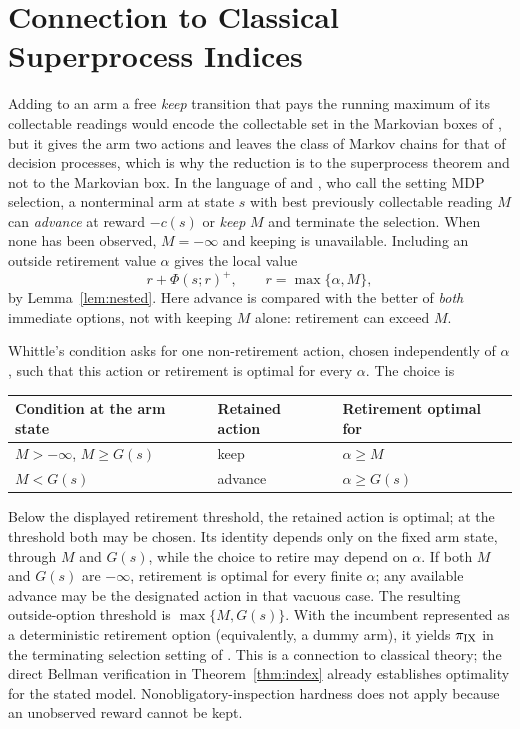 \section{Connection to Classical Superprocess Indices}
\label{app:remarks}

\begin{remark}\label{rem:whittle}
Adding to an arm a free \emph{keep} transition that pays the running maximum of its collectable
readings would encode the collectable set in the Markovian boxes of \citet{gupta2019markovian},
but it gives the arm two actions and leaves the class of Markov chains for that of decision
processes, which is why the reduction is to the superprocess theorem and not to the Markovian box.
In the language of \citet{whittle1980gittins} and \citet[\S5.2.2]{scully2025gittins}, who call the setting MDP selection, a
nonterminal arm at state $s$ with best previously collectable reading $M$ can \emph{advance}
at reward $-c(s)$ or \emph{keep} $M$ and terminate the selection. When none has been observed,
$M=-\infty$ and keeping is unavailable. Including an outside retirement value $\alpha$ gives
the local value
\[
r+\Phi(s;r)^+,\qquad r=\max\{\alpha,M\},
\]
by Lemma~\ref{lem:nested}. Here advance is compared with the better of \emph{both} immediate
options, not with keeping $M$ alone: retirement can exceed $M$.

Whittle's condition asks for one non-retirement action, chosen independently of $\alpha$,
such that this action or retirement is optimal for every $\alpha$. The choice is
\begin{center}
\begin{tabular}{lll}
\toprule
Condition at the arm state & Retained action & Retirement optimal for \\
\midrule
$M> -\infty$, $M\ge G(s)$ & keep & $\alpha\ge M$ \\
$M<G(s)$ & advance & $\alpha\ge G(s)$ \\
\bottomrule
\end{tabular}
\end{center}
Below the displayed retirement threshold, the retained action is optimal;
at the threshold both may be chosen. Its identity depends only on the fixed
arm state, through $M$ and $G(s)$, while the choice to retire may depend on $\alpha$.
If both $M$ and $G(s)$ are $-\infty$, retirement is optimal for every finite $\alpha$;
any available advance may be the designated action in that vacuous case.
The resulting outside-option threshold is $\max\{M,G(s)\}$. With the incumbent represented
as a deterministic retirement option (equivalently, a dummy arm), it yields
$\pi_{\rm IX}$ in the terminating selection setting of \citet{glazebrook1979stoppable}. This is a connection to classical theory; the direct Bellman
verification in Theorem~\ref{thm:index} already establishes optimality for the stated model.
Nonobligatory-inspection hardness \citep{fu2023nonobligatory} does not apply because an
unobserved reward cannot be kept.
\end{remark}

